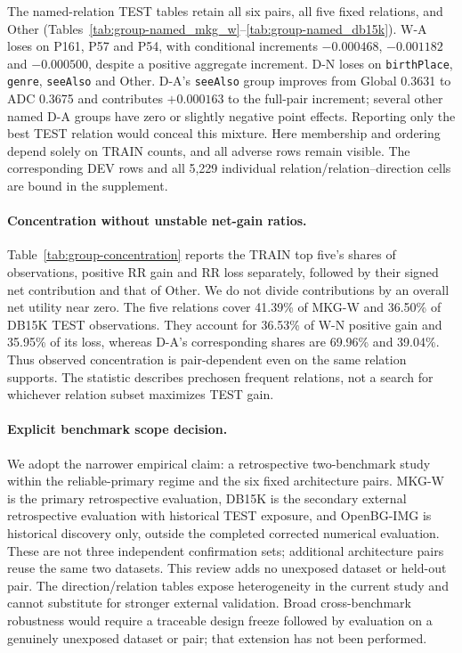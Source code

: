\documentclass[11pt,a4paper]{article}
\begin{document}
The named-relation TEST tables retain all six pairs, all five fixed relations, and Other (Tables~\ref{tab:group-named_mkg_w}--\ref{tab:group-named_db15k}). W-A loses on P161, P57 and P54, with conditional increments $-0.000468$, $-0.001182$ and $-0.000500$, despite a positive aggregate increment. D-N loses on \texttt{birthPlace}, \texttt{genre}, \texttt{seeAlso} and Other. D-A's \texttt{seeAlso} group improves from Global 0.3631 to ADC 0.3675 and contributes $+0.000163$ to the full-pair increment; several other named D-A groups have zero or slightly negative point effects. Reporting only the best TEST relation would conceal this mixture. Here membership and ordering depend solely on TRAIN counts, and all adverse rows remain visible. The corresponding DEV rows and all 5,229 individual relation/relation--direction cells are bound in the supplement.


\FloatBarrier

\paragraph{Concentration without unstable net-gain ratios.}
Table~\ref{tab:group-concentration} reports the TRAIN top five's shares of observations, positive RR gain and RR loss separately, followed by their signed net contribution and that of Other. We do not divide contributions by an overall net utility near zero. The five relations cover 41.39\% of MKG-W and 36.50\% of DB15K TEST observations. They account for 36.53\% of W-N positive gain and 35.95\% of its loss, whereas D-A's corresponding shares are 69.96\% and 39.04\%. Thus observed concentration is pair-dependent even on the same relation supports. The statistic describes prechosen frequent relations, not a search for whichever relation subset maximizes TEST gain.


\paragraph{Explicit benchmark scope decision.}
We adopt the narrower empirical claim: a retrospective two-benchmark study within the reliable-primary regime and the six fixed architecture pairs. MKG-W is the primary retrospective evaluation, DB15K is the secondary external retrospective evaluation with historical TEST exposure, and OpenBG-IMG is historical discovery only, outside the completed corrected numerical evaluation. These are not three independent confirmation sets; additional architecture pairs reuse the same two datasets. This review adds no unexposed dataset or held-out pair. The direction/relation tables expose heterogeneity in the current study and cannot substitute for stronger external validation. Broad cross-benchmark robustness would require a traceable design freeze followed by evaluation on a genuinely unexposed dataset or pair; that extension has not been performed.
\end{document}
